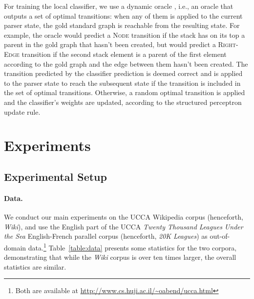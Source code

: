 \documentclass[11pt]{article}
\newcommand{\tabref}[1]{Table~\ref{#1}}
\begin{document}
For training the local classifier, we use a dynamic oracle \cite{goldberg2012dynamic},
i.e., an oracle that outputs a set of optimal transitions: when any of them
is applied to the current parser state, the gold
standard graph is reachable from the resulting state.
For example, the oracle would predict a \textsc{Node} transition if the stack 
has on its top a parent in the gold graph that hasn't been created,
but would predict a \textsc{Right-Edge} transition if the second stack
element is a parent of the
first element according to the gold graph and the edge between them hasn't been created.
The transition predicted by the classifier prediction is deemed correct
and is applied to the parser state to reach the subsequent state
if the transition is included in the set of optimal transitions.
Otherwise, a random optimal transition is applied
and the classifier's weights are updated, according to the structured perceptron
update rule.



\section{Experiments}\label{sec:experiments}

\subsection{Experimental Setup}

\paragraph{Data.}\label{sec:data}
We conduct our main experiments on the UCCA Wikipedia corpus (henceforth, \textit{Wiki}),
and use the English part of the UCCA \textit{Twenty Thousand Leagues Under the Sea} English-French parallel corpus (henceforth, \textit{20K Leagues}) as
out-of-domain data.\footnote{Both are available at \url{http://www.cs.huji.ac.il/~oabend/ucca.html}}
\tabref{table:data} presents some statistics for the two corpora, demonstrating that while
the \textit{Wiki} corpus is over ten times larger, the overall statistics are
similar.
\end{document}
